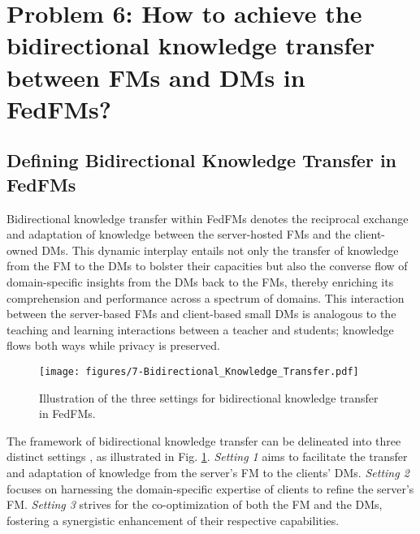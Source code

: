 \section{Problem 6: 
How to achieve the bidirectional knowledge transfer between FMs and DMs in FedFMs?
}

\subsection{Defining Bidirectional Knowledge Transfer in FedFMs}

Bidirectional knowledge transfer within FedFMs denotes the reciprocal exchange and adaptation of knowledge between the server-hosted FMs and the client-owned DMs. This dynamic interplay entails not only the transfer of knowledge from the FM to the DMs to bolster their capacities but also the converse flow of domain-specific insights from the DMs back to the FMs, thereby enriching its comprehension and performance across a spectrum of domains. 
This interaction between the server-based FMs and client-based small DMs is analogous to the teaching and learning interactions between a teacher and students; knowledge flows both ways while privacy is preserved.

\begin{figure}[ht]
    \centering
     \texttt{[image: figures/7-Bidirectional\_Knowledge\_Transfer.pdf]}
      
     \caption{Illustration of the three settings for bidirectional knowledge transfer in FedFMs.}
     \label{fig:Bidirectional}
 \end{figure}




The framework of bidirectional knowledge transfer can be delineated into three distinct settings \cite{kang2023grounding,xiao2023offsite,deng2023mutual}, as illustrated in Fig. \ref{fig:Bidirectional}.  \textit{Setting 1} aims to facilitate the transfer and adaptation of knowledge from the server's FM to the clients' DMs. \textit{Setting 2} focuses on harnessing the domain-specific expertise of clients to refine the server's FM. \textit{Setting 3} strives for the co-optimization of both the FM and the DMs, fostering a synergistic enhancement of their respective capabilities. 

